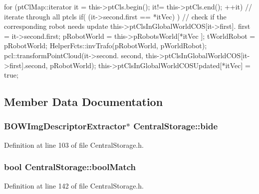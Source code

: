 \begin{DoxyCode}
{{{                        for (ptClMap::iterator it = this->ptCls.begin(); it!=
      this->ptCls.end(); ++it) {
                                // iterate through all ptcls
                                if( (it->second.first == *itVec) ) {
                                        // check if the corresponding robot
       needs update
                                        this->ptClsInGlobalWorldCOS[it->first].
      first = it->second.first;
                                        pRobotWorld = this->pRobotsWorld[*itVec
      ];
                                        tWorldRobot = pRobotWorld;
                                        HelperFcts::invTrafo(pRobotWorld,
      pWorldRobot);
                                        pcl::transformPointCloud(it->second.
      second, this->ptClsInGlobalWorldCOS[it->first].second, pRobotWorld);
                                }
                        }
                        this->ptClsInGlobalWorldCOSUpdated[*itVec] = true;
                }
        }
}
\end{DoxyCode}


\subsection{\-Member \-Data \-Documentation}
\hypertarget{classCentralStorage_ab1828f1368902fab93265328a6e53063}{
\subsubsection[{bide}]{\setlength{\rightskip}{0pt plus 5cm}\-B\-O\-W\-Img\-Descriptor\-Extractor$\ast$ {\bf \-Central\-Storage\-::bide}}}\label{classCentralStorage_ab1828f1368902fab93265328a6e53063}


\-Definition at line 103 of file \-Central\-Storage.\-h.

\hypertarget{classCentralStorage_a311e52441ce3ca79a2eac623c58221cc}{
\subsubsection[{bool\-Match}]{\setlength{\rightskip}{0pt plus 5cm}bool {\bf \-Central\-Storage\-::bool\-Match}}}\label{classCentralStorage_a311e52441ce3ca79a2eac623c58221cc}


\-Definition at line 142 of file \-Central\-Storage.\-h.

